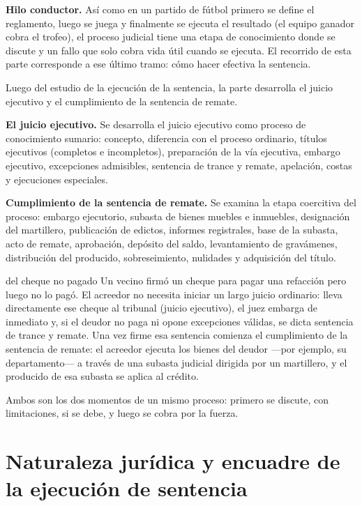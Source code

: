 \documentclass[12pt,oneside]{book}
\begin{document}
\textbf{Hilo conductor.} Así como en un partido de fútbol primero se define el reglamento, luego se juega y finalmente se ejecuta el resultado (el equipo ganador cobra el trofeo), el proceso judicial tiene una etapa de conocimiento donde se discute y un fallo que solo cobra vida útil cuando se ejecuta. El recorrido de esta parte corresponde a ese último tramo: cómo hacer efectiva la sentencia.

Luego del estudio de la ejecución de la sentencia, la parte desarrolla el juicio ejecutivo y el cumplimiento de la sentencia de remate.

\textbf{El juicio ejecutivo.} Se desarrolla el juicio ejecutivo como proceso de conocimiento sumario: concepto, diferencia con el proceso ordinario, títulos ejecutivos (completos e incompletos), preparación de la vía ejecutiva, embargo ejecutivo, excepciones admisibles, sentencia de trance y remate, apelación, costas y ejecuciones especiales.

\textbf{Cumplimiento de la sentencia de remate.} Se examina la etapa coercitiva del proceso: embargo ejecutorio, subasta de bienes muebles e inmuebles, designación del martillero, publicación de edictos, informes registrales, base de la subasta, acto de remate, aprobación, depósito del saldo, levantamiento de gravámenes, distribución del producido, sobreseimiento, nulidades y adquisición del título.

\begin{example}{del cheque no pagado}
Un vecino firmó un cheque para pagar una refacción pero luego no lo pagó. El acreedor no necesita iniciar un largo juicio ordinario: lleva directamente ese cheque al tribunal (juicio ejecutivo), el juez embarga de inmediato y, si el deudor no paga ni opone excepciones válidas, se dicta sentencia de trance y remate. Una vez firme esa sentencia comienza el cumplimiento de la sentencia de remate: el acreedor ejecuta los bienes del deudor ---por ejemplo, su departamento--- a través de una subasta judicial dirigida por un martillero, y el producido de esa subasta se aplica al crédito.
\end{example}

Ambos son los dos momentos de un mismo proceso: primero se discute, con limitaciones, si se debe, y luego se cobra por la fuerza.

\chapter[Naturaleza y encuadre de la ejecución]{Naturaleza jurídica y encuadre de la ejecución de sentencia}\label{cap:ejec-naturaleza}
\end{document}
